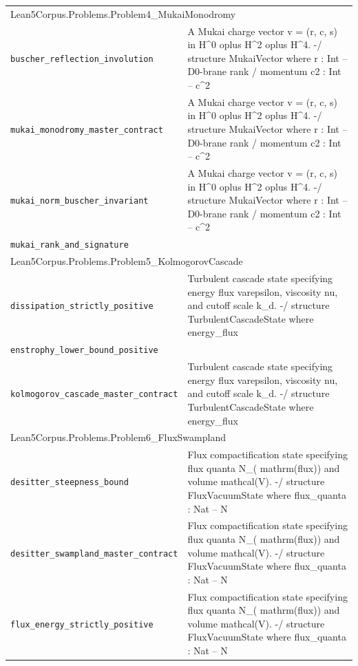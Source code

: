 \begin{longtable}{p{}p{}}
\multicolumn{2}{l}{\textsf{\small Lean5Corpus.Problems.Problem4\_MukaiMonodromy}} \\
\quad\texttt{\footnotesize buscher\_reflection\_involution} & {\footnotesize A Mukai charge vector v = (r, c, s)  in H\^{}0  oplus H\^{}2  oplus H\^{}4. -/ structure MukaiVector where r : Int -- D0-brane rank / momentum c2 : Int -- c\^{}2 } \\
\quad\texttt{\footnotesize mukai\_monodromy\_master\_contract} & {\footnotesize A Mukai charge vector v = (r, c, s)  in H\^{}0  oplus H\^{}2  oplus H\^{}4. -/ structure MukaiVector where r : Int -- D0-brane rank / momentum c2 : Int -- c\^{}2 } \\
\quad\texttt{\footnotesize mukai\_norm\_buscher\_invariant} & {\footnotesize A Mukai charge vector v = (r, c, s)  in H\^{}0  oplus H\^{}2  oplus H\^{}4. -/ structure MukaiVector where r : Int -- D0-brane rank / momentum c2 : Int -- c\^{}2 } \\
\quad\texttt{\footnotesize mukai\_rank\_and\_signature} & {\footnotesize } \\
\multicolumn{2}{l}{\textsf{\small Lean5Corpus.Problems.Problem5\_KolmogorovCascade}} \\
\quad\texttt{\footnotesize dissipation\_strictly\_positive} & {\footnotesize Turbulent cascade state specifying energy flux  varepsilon, viscosity  nu, and cutoff scale k\_d. -/ structure TurbulentCascadeState where energy\_flux } \\
\quad\texttt{\footnotesize enstrophy\_lower\_bound\_positive} & {\footnotesize } \\
\quad\texttt{\footnotesize kolmogorov\_cascade\_master\_contract} & {\footnotesize Turbulent cascade state specifying energy flux  varepsilon, viscosity  nu, and cutoff scale k\_d. -/ structure TurbulentCascadeState where energy\_flux } \\
\multicolumn{2}{l}{\textsf{\small Lean5Corpus.Problems.Problem6\_FluxSwampland}} \\
\quad\texttt{\footnotesize desitter\_steepness\_bound} & {\footnotesize Flux compactification state specifying flux quanta N\_( mathrm(flux)) and volume  mathcal(V). -/ structure FluxVacuumState where flux\_quanta : Nat -- N} \\
\quad\texttt{\footnotesize desitter\_swampland\_master\_contract} & {\footnotesize Flux compactification state specifying flux quanta N\_( mathrm(flux)) and volume  mathcal(V). -/ structure FluxVacuumState where flux\_quanta : Nat -- N} \\
\quad\texttt{\footnotesize flux\_energy\_strictly\_positive} & {\footnotesize Flux compactification state specifying flux quanta N\_( mathrm(flux)) and volume  mathcal(V). -/ structure FluxVacuumState where flux\_quanta : Nat -- N} \\

\end{longtable}
